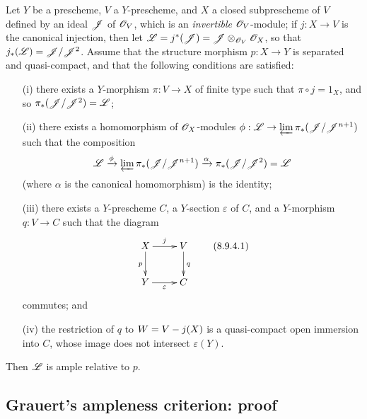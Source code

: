 \begin{proposition}[8.9.4]
\label{II.8.9.4}
Let $Y$ be a prescheme, $V$ a $Y$-prescheme, and $X$ a closed subprescheme of $V$ defined by an ideal $\mathscr{J}$ of $\mathscr{O}_V$, which is an \emph{invertible} $\mathscr{O}_V$-module;
if $j:X\to V$ is
the canonical injection, then let $\mathscr{L} = j^*(\mathscr{J}) = \mathscr{J}\otimes_{\mathscr{O}_V}\mathscr{O}_X$, so that $j_*(\mathscr{L})=\mathscr{J}/\mathscr{J}^2$.
Assume that the structure morphism $p:X\to Y$ is separated and quasi-compact, and that the following conditions are satisfied:
\begin{enumerate}
  \item[\rm{(i)}] there exists a $Y$-morphism $\pi:V\to X$ of finite type such that $\pi\circ j=1_X$, and so $\pi_*(\mathscr{J}/\mathscr{J}^2)=\mathscr{L}$;
  \item[\rm{(ii)}] there exists a homomorphism of $\mathscr{O}_X$-modules $\vphi:\sh{L}\to\varprojlim\pi_*(\sh{J}/\sh{J}^{n+1})$ such that the composition
    \[
      \mathscr{L}
      \xrightarrow{\phi}
      \varprojlim \pi_*(\mathscr{J}/\mathscr{J}^{n+1})
      \xrightarrow{\alpha}
      \pi_*(\mathscr{J}/\mathscr{J}^2) = \mathscr{L}
    \]
    (where $\alpha$ is the canonical homomorphism) is the identity;
  \item[\rm{(iii)}] there exists a $Y$-prescheme $C$, a $Y$-section $\varepsilon$ of $C$, and a $Y$-morphism $q:V\to C$ such that the diagram
    \[
    \label{II.8.9.4.1}
      \xymatrix{
        X
          \ar[r]^{j}
          \ar[d]_{p}
      & V
          \ar[d]^{q}
      \\Y
          \ar[r]_{\varepsilon}
      & C
      }
    \tag{8.9.4.1}
    \]
    commutes; and
  \item[\rm{(iv)}] the restriction of $q$ to $W=V- j(X)$ is a quasi-compact open immersion into $C$, whose image does not intersect $\varepsilon(Y)$.
\end{enumerate}
Then $\mathscr{L}$ is ample relative to $p$.
\end{proposition}


\subsection{Grauert's ampleness criterion: proof}
\label{subsection:II.8.10}

